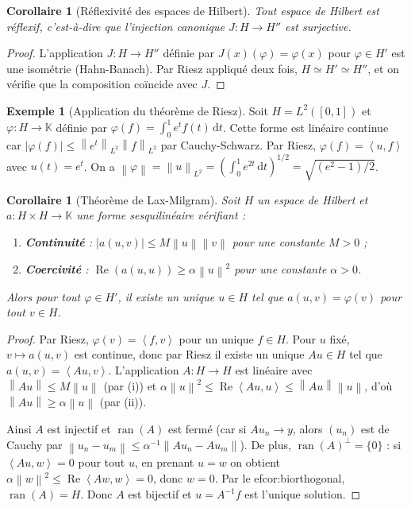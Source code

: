 \documentclass[a4paper,12pt]{book}
\DeclareMathOperator{\ran}{ran}
\newcommand{\K}{\mathbb{K}}
\newcommand{\dd}{\mathrm{d}}
\newcommand{\norm}[1]{\left\| #1 \right\|}
\newcommand{\abs}[1]{\left| #1 \right|}
\newcommand{\inner}[2]{\left\langle #1, #2 \right\rangle}
\theoremstyle{definition}
\newtheorem{exemple}[definition]{Exemple}
\theoremstyle{plain}
\newtheorem{corollaire}[definition]{Corollaire}
\theoremstyle{remark}
\begin{document}
\begin{corollaire}[Réflexivité des espaces de Hilbert]\label{cor:hilbert-reflexif}
Tout espace de Hilbert est réflexif, c'est-à-dire que l'injection canonique $J : H \to H''$ est surjective.
\end{corollaire}

\begin{proof}
L'application $J : H \to H''$ définie par $J(x)(\varphi) = \varphi(x)$ pour $\varphi \in H'$ est une isométrie (Hahn-Banach). Par Riesz appliqué deux fois, $H \simeq H' \simeq H''$, et on vérifie que la composition coïncide avec $J$.
\end{proof}

\begin{exemple}[Application du théorème de Riesz]\label{ex:riesz-application}
Soit $H = L^2([0,1])$ et $\varphi : H \to \K$ définie par $\varphi(f) = \int_0^1 e^t f(t)\,\dd t$. Cette forme est linéaire continue car $\abs{\varphi(f)} \leq \norm{e^t}_{L^2}\norm{f}_{L^2}$ par Cauchy-Schwarz. Par Riesz, $\varphi(f) = \inner{u}{f}$ avec $u(t) = e^t$. On a $\norm{\varphi} = \norm{u}_{L^2} = \left(\int_0^1 e^{2t}\,\dd t\right)^{1/2} = \sqrt{(e^2-1)/2}$.
\end{exemple}

\begin{corollaire}[Théorème de Lax-Milgram]\label{cor:lax-milgram}
Soit $H$ un espace de Hilbert et $a : H \times H \to \K$ une forme sesquilinéaire vérifiant :
\begin{enumerate}[label=(\roman*)]
    \item \textbf{Continuité} : $\abs{a(u,v)} \leq M\norm{u}\norm{v}$ pour une constante $M > 0$ ;
    \item \textbf{Coercivité} : $\operatorname{Re}(a(u,u)) \geq \alpha\norm{u}^2$ pour une constante $\alpha > 0$.
\end{enumerate}
Alors pour tout $\varphi \in H'$, il existe un unique $u \in H$ tel que $a(u,v) = \varphi(v)$ pour tout $v \in H$.
\end{corollaire}

\begin{proof}
Par Riesz, $\varphi(v) = \inner{f}{v}$ pour un unique $f \in H$. Pour $u$ fixé, $v \mapsto a(u,v)$ est continue, donc par Riesz il existe un unique $Au \in H$ tel que $a(u,v) = \inner{Au}{v}$. L'application $A : H \to H$ est linéaire avec $\norm{Au} \leq M\norm{u}$ (par (i)) et $\alpha\norm{u}^2 \leq \operatorname{Re}\inner{Au}{u} \leq \norm{Au}\norm{u}$, d'où $\norm{Au} \geq \alpha\norm{u}$ (par (ii)).

Ainsi $A$ est injectif et $\ran(A)$ est fermé (car si $Au_n \to y$, alors $(u_n)$ est de Cauchy par $\norm{u_n - u_m} \leq \alpha^{-1}\norm{Au_n - Au_m}$). De plus, $\ran(A)^\perp = \{0\}$ : si $\inner{Au}{w} = 0$ pour tout $u$, en prenant $u = w$ on obtient $\alpha\norm{w}^2 \leq \operatorname{Re}\inner{Aw}{w} = 0$, donc $w = 0$. Par le 
ef{cor:biorthogonal}, $\ran(A) = H$. Donc $A$ est bijectif et $u = A^{-1}f$ est l'unique solution.
\end{proof}
\end{document}
